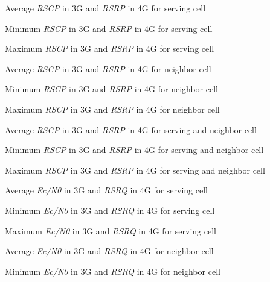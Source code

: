 %
{Average \textit{RSCP} in 3G and \textit{RSRP} in 4G for serving cell}

%
{Minimum \textit{RSCP} in 3G and \textit{RSRP} in 4G  for serving cell}

%
{Maximum \textit{RSCP} in 3G and \textit{RSRP} in 4G for serving cell}


%
{Average \textit{RSCP} in 3G and \textit{RSRP} in 4G for neighbor cell}

%
{Minimum \textit{RSCP} in 3G and \textit{RSRP} in 4G  for neighbor cell}

%
{Maximum \textit{RSCP} in 3G and \textit{RSRP} in 4G for neighbor cell}


%
{Average \textit{RSCP} in 3G and \textit{RSRP} in 4G for serving and neighbor cell}

%
{Minimum \textit{RSCP} in 3G and \textit{RSRP} in 4G for serving and neighbor cell}

%
{Maximum \textit{RSCP} in 3G and \textit{RSRP} in 4G for serving and neighbor cell}



%
{Average \textit{Ec/N0} in 3G and \textit{RSRQ} in 4G for serving cell}

%
{Minimum \textit{Ec/N0} in 3G and \textit{RSRQ} in 4G  for serving cell}

%
{Maximum \textit{Ec/N0} in 3G and \textit{RSRQ} in 4G for serving cell}


%
{Average \textit{Ec/N0} in 3G and \textit{RSRQ} in 4G for neighbor cell}

%
{Minimum \textit{Ec/N0} in 3G and \textit{RSRQ} in 4G  for neighbor cell}

